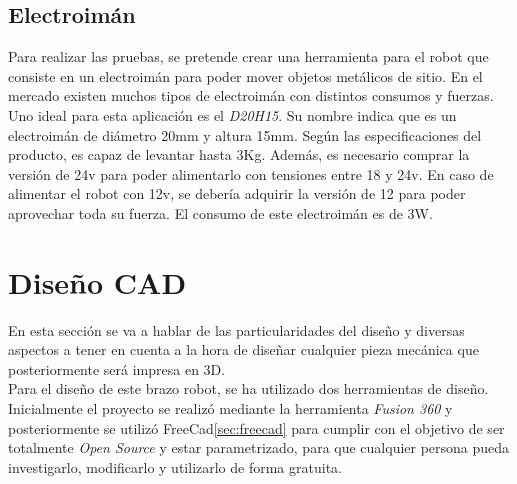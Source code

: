 \subsection{Electroimán}
Para realizar las pruebas, se pretende crear una herramienta para el robot que consiste en un electroimán para poder mover objetos metálicos 
de sitio. En el mercado existen muchos tipos de electroimán con distintos consumos y fuerzas. Uno ideal para esta aplicación es el \textit{D20H15}.
Su nombre indica que es un electroimán de diámetro 20mm y altura 15mm. Según las especificaciones del producto, es capaz de levantar hasta 3Kg. 
Además, es necesario comprar la versión de 24v para poder alimentarlo con tensiones entre 18 y 24v. En caso de alimentar el robot con 12v, se debería 
adquirir la versión de 12 para poder aprovechar toda su fuerza. El consumo de este electroimán es de 3W.
\newpage
\section{Diseño CAD}
En esta sección se va a hablar de las particularidades del diseño y diversas aspectos a tener en cuenta a la hora de diseñar 
cualquier pieza mecánica que posteriormente será impresa en 3D. 
\\
Para el diseño de este brazo robot, se ha utilizado dos herramientas de diseño. Inicialmente el proyecto se realizó mediante 
la herramienta \textit{Fusion 360} y posteriormente se utilizó FreeCad\ref{sec:freecad} para cumplir con el objetivo de ser totalmente 
\textit{Open Source} y estar parametrizado, para que cualquier persona pueda investigarlo, modificarlo y utilizarlo de forma gratuita.
\\ 

